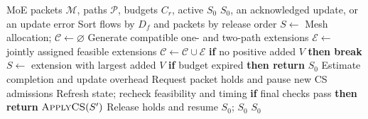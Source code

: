 \begin{algorithm}[H]
  \caption{MoE-plane CS configuration}
  \label{alg:noc-configuration}
  \small
  \begin{algorithmic}[1]
    \Require MoE packets $\mathcal M$, paths $\mathcal P$, budgets $C_r$, active $S_0$
    \Ensure $S_0$, an acknowledged update, or an update error
    \State Sort flows by $D_f$ and packets by release order
    \State $S\gets$ Mesh allocation; $\mathcal C\gets\varnothing$
      \State Generate compatible one- and two-path extensions
      \State $\mathcal E\gets$ jointly assigned feasible extensions
      \State $\mathcal C\gets\mathcal C\cup\mathcal E$
      \State \textbf{if} no positive added $V$ \textbf{then break}
      \State $S\gets$ extension with largest added $V$
    \EndWhile
      \State \textbf{if} budget expired \textbf{then return} $S_0$
      \State Estimate completion and update overhead
        \State Request packet holds and pause new CS admissions
          \State Refresh state; recheck feasibility and timing
          \State \textbf{if} final checks pass \textbf{then return} $\Call{ApplyCS}{S'}$
        \EndIf
        \State Release holds and resume $S_0$; \Return $S_0$
      \EndIf
    \EndFor
    \State \Return $S_0$
  \end{algorithmic}
\end{algorithm}
